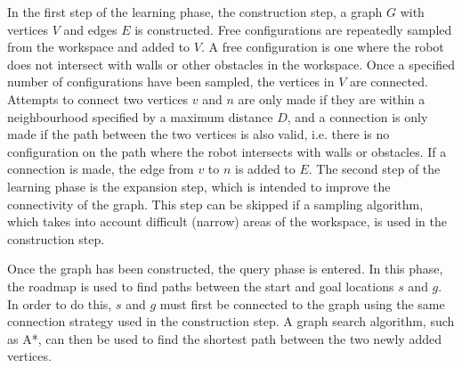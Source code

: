 \documentclass[conference]{IEEEtran}
\begin{document}
In the first step of the learning phase, the construction step, a graph $G$ with vertices $V$ and edges $E$ is constructed. Free configurations are repeatedly sampled from the workspace and added to $V$. A free configuration is one where the robot does not intersect with walls or other obstacles in the workspace. Once a specified number of configurations have been sampled, the vertices in $V$ are connected. Attempts to connect two vertices $v$ and $n$ are only made if they are within a neighbourhood specified by a maximum distance $D$, and a connection is only made if the path between the two vertices is also valid, i.e. there is no configuration on the path where the robot intersects with walls or obstacles. If a connection is made, the edge from $v$ to $n$ is added to $E$. The second step of the learning phase is the expansion step, which is intended to improve the connectivity of the graph. This step can be skipped if a sampling algorithm, which takes into account difficult (narrow) areas of the workspace, is used in the construction step.

Once the graph has been constructed, the query phase is entered. In this phase, the roadmap is used to find paths between the start and goal locations $s$ and $g$. In order to do this, $s$ and $g$ must first be connected to the graph using the same connection strategy used in the construction step. A graph search algorithm, such as A*, can then be used to find the shortest path between the two newly added vertices.
\end{document}

